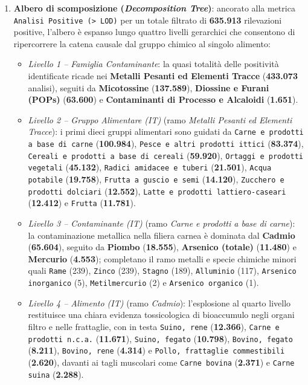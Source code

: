\begin{enumerate}
    \item \textbf{Albero di scomposizione (\textit{Decomposition Tree})}: ancorato alla metrica \texttt{Analisi Positive (\textgreater{} LOD)} per un totale filtrato di \textbf{635.913} rilevazioni positive, l'albero è espanso lungo quattro livelli gerarchici che consentono di ripercorrere la catena causale dal gruppo chimico al singolo alimento:
    \begin{itemize}
        \item \textit{Livello 1 -- Famiglia Contaminante}: la quasi totalità delle positività identificate ricade nei \textbf{Metalli Pesanti ed Elementi Tracce} (\textbf{433.073} analisi), seguiti da \textbf{Micotossine} (\textbf{137.589}), \textbf{Diossine e Furani (POPs)} (\textbf{63.600}) e \textbf{Contaminanti di Processo e Alcaloidi} (\textbf{1.651}).
        \item \textit{Livello 2 -- Gruppo Alimentare (IT)} (ramo \textit{Metalli Pesanti ed Elementi Tracce}): i primi dieci gruppi alimentari sono guidati da \texttt{Carne e prodotti a base di carne} (\textbf{100.984}), \texttt{Pesce e altri prodotti ittici} (\textbf{83.374}), \texttt{Cereali e prodotti a base di cereali} (\textbf{59.920}), \texttt{Ortaggi e prodotti vegetali} (\textbf{45.132}), \texttt{Radici amidacee e tuberi} (\textbf{21.501}), \texttt{Acqua potabile} (\textbf{19.758}), \texttt{Frutta a guscio e semi} (\textbf{14.120}), \texttt{Zucchero e prodotti dolciari} (\textbf{12.552}), \texttt{Latte e prodotti lattiero-caseari} (\textbf{12.412}) e \texttt{Frutta} (\textbf{11.781}).
        \item \textit{Livello 3 -- Contaminante (IT)} (ramo \textit{Carne e prodotti a base di carne}): la contaminazione metallica nella filiera carnea è dominata dal \textbf{Cadmio} (\textbf{65.604}), seguito da \textbf{Piombo} (\textbf{18.555}), \textbf{Arsenico (totale)} (\textbf{11.480}) e \textbf{Mercurio} (\textbf{4.553}); completano il ramo metalli e specie chimiche minori quali \texttt{Rame} (239), \texttt{Zinco} (239), \texttt{Stagno} (189), \texttt{Alluminio} (117), \texttt{Arsenico inorganico} (5), \texttt{Metilmercurio} (2) e \texttt{Arsenico organico} (1).
        \item \textit{Livello 4 -- Alimento (IT)} (ramo \textit{Cadmio}): l'esplosione al quarto livello restituisce una chiara evidenza tossicologica di bioaccumulo negli organi filtro e nelle frattaglie, con in testa \texttt{Suino, rene} (\textbf{12.366}), \texttt{Carne e prodotti n.c.a.} (\textbf{11.671}), \texttt{Suino, fegato} (\textbf{10.798}), \texttt{Bovino, fegato} (\textbf{8.211}), \texttt{Bovino, rene} (\textbf{4.314}) e \texttt{Pollo, frattaglie commestibili} (\textbf{2.620}), davanti ai tagli muscolari come \texttt{Carne bovina} (\textbf{2.371}) e \texttt{Carne suina} (\textbf{2.288}).
    \end{itemize}


\end{enumerate}

